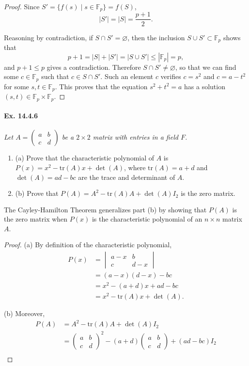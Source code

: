 \documentclass[11pt,a4paper]{article}
\newcommand{\be} {\begin{enumerate}}
\newcommand{\ee} {\end{enumerate}}
\newcommand{\F}{\mathbb{F}}
\begin{document}
{\begin{proof}
Since $S' = \{f(s) \mid s \in \F_p\} = f(S)$,
$$|S'| = |S| = \frac{p+1}{2}.$$

Reasoning by contradiction, if $S \cap S' =\varnothing$, then the inclusion $S \cup S' \subset \F_p$ shows that
$$p + 1 = |S| + |S'| = |S \cup S'| \leq |\F_p| = p,$$
and $p+1 \leq p$ gives a contradiction. Therefore $S \cap S' \ne \varnothing$, so that we can find some $c \in \F_p$ such that $c \in S \cap S'$. Such an element $c$ verifies
$c = s^2$ and $c = a-t^2$ for some $s,t \in \F_p$. This proves that the equation $s^2 + t^2 = a$ has a solution $(s,t) \in \F_p \times \F_p$.
\end{proof}

\paragraph{Ex. 14.4.6}{\it Let $A = \begin{pmatrix} a & b \\ c & d \end{pmatrix}$ be a $2 \times 2$ matrix with entries in a field $F$.
\be
\item[(a)] Prove that the characteristic polynomial of $A$ is $P(x) = x^2 - \mathrm{tr}(A) x + \det(A)$, where $\mathrm{tr}(A) = a+d$ and $\det(A) =ad-bc$ are the trace and determinant of $A$.
\item[(b)] Prove that $P(A) = A^2 - \mathrm{tr}(A) A + \det(A) I_2$ is the zero matrix.
\ee
The Cayley-Hamilton Theorem generalizes part (b) by showing that $P(A)$ is the zero matrix when $P(x)$ is the characteristic polynomial of an $n\times n$ matrix $A$.
}
\begin{proof}
\item[(a)] By definition of the characteristic polynomial,
\begin{align*}
P(x) &= 
\begin{vmatrix}
a - x & b\\
c &d-x
\end{vmatrix}\\
&= (a-x)(d-x) - bc\\
&= x^2 -(a+d) x + ad-bc\\
&=x^2 - \mathrm{tr}(A) x + \det(A).
\end{align*}
\item[(b)] Moreover,
\begin{align*}
P(A) &=  A^2 - \mathrm{tr}(A) A + \det(A) I_2\\
&=  \begin{pmatrix} a & b \\ c & d \end{pmatrix}^2 - (a+d)  \begin{pmatrix} a & b \\ c & d \end{pmatrix} + (ad- bc)I_2\\

\end{align*}
\end{proof}}
\end{document}

